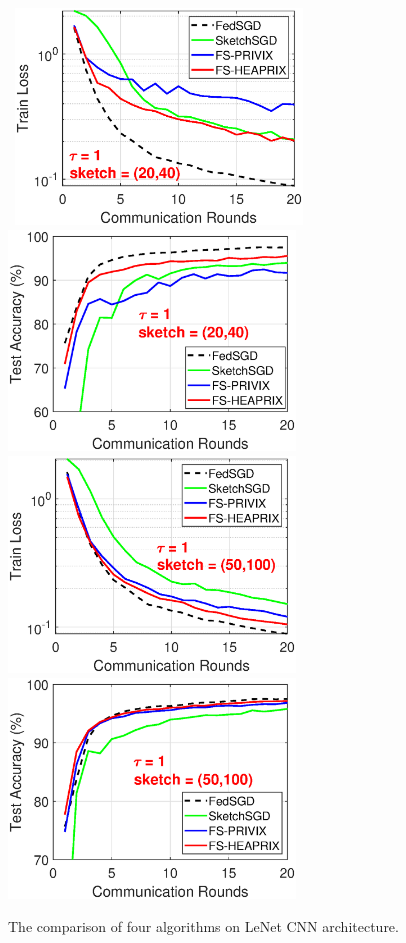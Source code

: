 \begin{figure}[h]
	\begin{center}
		\mbox{			    \includegraphics[width=3in]{MNIST_figures/local1_sketch20_iid1_train_loss.eps}
		\includegraphics[width=3in]{MNIST_figures/local1_sketch20_iid1_test_acc.eps}
		}
		\mbox{
		\includegraphics[width=3in]{MNIST_figures/local1_sketch50_iid1_train_loss.eps}
		\includegraphics[width=3in]{MNIST_figures/local1_sketch50_iid1_test_acc.eps}
		}
	\end{center}
	\caption{The comparison of four algorithms on LeNet CNN architecture.}
    \label{fig:MNIST-tau1}
\end{figure}

